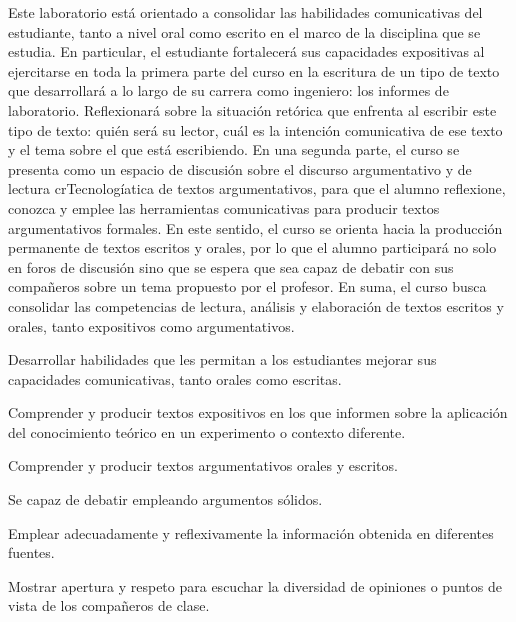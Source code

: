 \begin{syllabus}


\begin{justification}
Este laboratorio está orientado a consolidar las habilidades comunicativas del estudiante, tanto a nivel oral como escrito en el marco de la disciplina que se estudia. En particular, el estudiante fortalecerá sus capacidades expositivas al ejercitarse en toda la primera parte del curso en la escritura de un tipo de texto que
desarrollará a lo largo de su carrera como ingeniero: los informes de laboratorio. Reflexionará sobre la situación retórica que enfrenta al escribir este tipo de texto: quién será su lector, cuál es la intención comunicativa de ese texto y el tema sobre el que está escribiendo.
En una segunda parte, el curso se presenta como un espacio de discusión sobre el discurso argumentativo y de lectura crTecnologíatica de textos argumentativos, para que el alumno reflexione, conozca y emplee las herramientas comunicativas para producir textos argumentativos formales. En este sentido, el curso se orienta hacia la producción
permanente de textos escritos y orales, por lo que el alumno participará no solo en foros de discusión sino que se espera que sea capaz de debatir con sus compañeros sobre un tema propuesto por el profesor. En suma, el curso busca consolidar las competencias de lectura, análisis y elaboración de textos escritos y orales, tanto expositivos como argumentativos.
\end{justification}

\begin{goals}
\item Desarrollar habilidades que les permitan a los estudiantes mejorar sus capacidades comunicativas, tanto orales como escritas.
\item Comprender y producir textos expositivos en los que informen sobre la aplicación del conocimiento teórico en un experimento o contexto diferente.
\item Comprender y producir textos argumentativos orales y escritos.
\item Se capaz de debatir empleando argumentos sólidos.
\item Emplear adecuadamente y reflexivamente la información obtenida en diferentes fuentes.
\item Mostrar apertura y respeto para escuchar la diversidad de opiniones o puntos de vista de los compañeros de clase.
\end{goals}


\end{syllabus}

